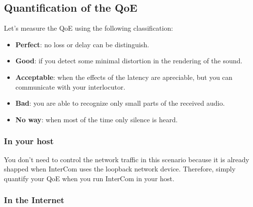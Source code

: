 \subsection{Quantification of the QoE}

Let's measure the QoE using the following classification:
\begin{itemize}
\item \textbf{Perfect}: no loss or delay can be distinguish.
\item \textbf{Good}: if you detect some minimal distortion in the
  rendering of the sound.
\item \textbf{Acceptable}: when the effects of the latency are
  apreciable, but you can communicate with your interlocutor.
\item \textbf{Bad}: you are able to recognize only small parts of the
  received audio.
\item \textbf{No way}: when most of the time only silence is heard.
\end{itemize}

\subsubsection{In your host}

You don't need to control the network traffic in this scenario because
it is already shapped when InterCom uses the loopback network
device. Therefore, simply quantify your QoE when you run InterCom in
your host.

\subsubsection{In the Internet}

